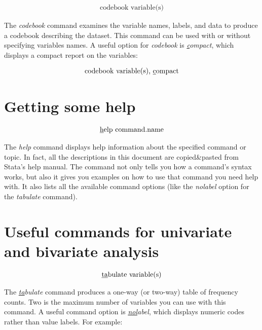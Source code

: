 \documentclass[paper=a4, fontsize=11pt]{scrartcl} %
\numberwithin{equation}{section} %
\numberwithin{figure}{section} %
\numberwithin{table}{section} %
\begin{document}
\begin{align}
	\text{codebook variable(s)}
\end{align}

The \textit{codebook} command examines the variable names, labels, and data to produce a codebook describing the dataset. This command can be used with or without specifying variables names. A useful option for \textit{codebook} is \textit{\underline{c}ompact}, which displays a compact report on the variables:

\begin{align}
	\text{codebook variable(s), \underline{c}ompact}
\end{align}


\section{Getting some help}

\begin{align}
	\text{\underline{h}elp command.name} 
\end{align}

The \textit{help} command displays help information about the specified command or topic. In fact, all the descriptions in this document are copied\&pasted from Stata's help manual. The  command not only tells you how a command's syntax works, but also it gives you examples on how to use that command you need help with. It also lists all the available command options (like the \textit{nolabel} option for the \textit{tabulate} command). 
 

\section{Useful commands for univariate and bivariate analysis}

\begin{align}
	\text{\underline{ta}bulate variable(s)}
\end{align}

The \textit{\underline{ta}bulate} command produces a one-way (or two-way) table of frequency counts. Two is the maximum number of variables you can use with this command. A useful command option is \textit{\underline{nol}abel}, which displays numeric codes rather than value labels. For example:
\end{document}
